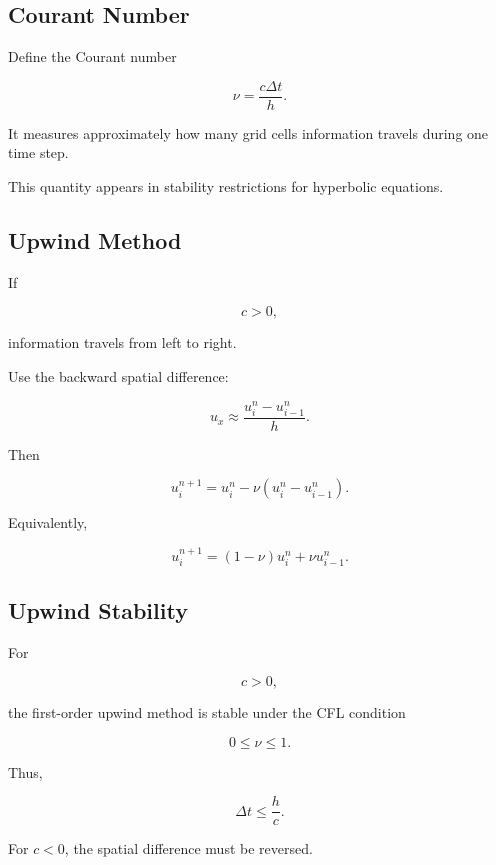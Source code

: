 \subsection{Courant Number}
\label{subsec:courant-number}

Define the Courant number

\[
\boxed{
\nu
=
\frac{
c\Delta t
}{
h
}.
}
\]

It measures approximately how many grid cells information travels during
one time step.

This quantity appears in stability restrictions for hyperbolic equations.

\subsection{Upwind Method}
\label{subsec:upwind-method}

If

\[
c>0,
\]

information travels from left to right.

Use the backward spatial difference:

\[
u_x
\approx
\frac{
u_i^n-u_{i-1}^n
}{
h
}.
\]

Then

\[
\boxed{
u_i^{n+1}
=
u_i^n
-
\nu
\left(
u_i^n-u_{i-1}^n
\right).
}
\]

Equivalently,

\[
\boxed{
u_i^{n+1}
=
(1-\nu)u_i^n
+
\nu u_{i-1}^n.
}
\]

\subsection{Upwind Stability}
\label{subsec:upwind-stability}

For

\[
c>0,
\]

the first-order upwind method is stable under the CFL condition

\[
\boxed{
0\leq\nu\leq1.
}
\]

Thus,

\[
\boxed{
\Delta t
\leq
\frac{h}{c}.
}
\]

For \(c<0\), the spatial difference must be reversed.

